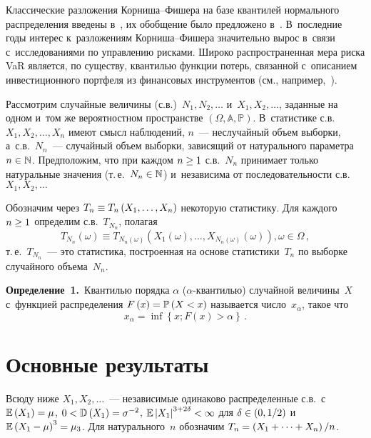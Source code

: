 \begin{multicols}{2}
Классические разложения
Кор\-ни\-ша--Фи\-ше\-ра на базе квантилей нормального  распределения введены
в~\cite{CornFish}, их обобщение было предложено в~\cite{HillDavis}.
В~последние годы интерес к~разложениям Кор\-ни\-ша--Фи\-ше\-ра значительно
вырос в~связи с~исследованиями по управ\-ле\-нию рисками. Широко
распространенная мера риска VaR является, по
существу, квантилью функции потерь, связанной с~описанием
инвестиционного портфеля из  финансовых инструментов (см., например,~\cite{Jashke}).


Рассмотрим случайные величины (с.в.)\ $N_{1}, N_{2}, \ldots$ и~$X_1, X_2, \ldots$, 
заданные на одном и~том же вероятностном пространстве 
$\left(\Omega,\mathbb{A},\mathbb{P}\right)$. В~статистике 
с.в.~$X_1, X_2, \ldots, X_n$ имеют смысл наблюдений, $n$~--- 
неслучайный объем выборки, а~с.в.~$N_n$~--- случайный объем выборки, зависящий 
от натурального параметра $n \hm\in \mathbb{N}$. Предположим, что при каждом 
$n \hm\ge 1$ с.в.~$N_n$ принимает только натуральные значения (т.\,е.\
$N_n \hm\in \mathbb{N}$) и~независима от последовательности с.в. $X_1, X_2, \ldots$

Обозначим через $T_n \hm\equiv T_n \left(X_1, \ldots, X_n\right)$ некоторую статистику.
 Для каждого $n \hm\ge 1$ определим с.в.~$T_{N_n}$, полагая
$$
T_{N_n} (\omega) \equiv T_{N_n(\omega)} \left(X_1 (\omega), \ldots, X_{N_n (\omega)} 
(\omega)\right),\omega \in \Omega\,,
$$
т.\,е.\ $T_{N_n}$~--- это статистика, построенная на основе статистики~$T_n$ 
по выборке случайного объема~$N_n$.

\smallskip

\noindent
\textbf{Определение~1.}\
Квантилью порядка $\alpha$ ($\alpha$-кван\-тилью) случайной величины~$X$ 
с~функцией распределения $F\left(x\right)\hm=\mathbb{P}\left(X<x\right)$ 
называется число~$x_{\alpha}$, такое что
$$ 
x_{\alpha} = \inf \left\{ x; F(x)>\alpha \right\}\,.
 $$

\section{Основные результаты}

Всюду ниже $X_1, X_2, \ldots $~--- независимые одинаково распределенные 
с.в.\ с~$\mathbb{E}\left(X_1\right)\hm=\mu$, 
$ 0\hm<\mathbb{D}\left(X_1\right)\hm=\sigma^{-2}$, 
$\mathbb{E}\left|X_1\right|^{3+2\delta}\hm < \infty$ для $\delta\hm \in 
\left(0,1/2\right)$ и~$\mathbb{E}\left(X_1\hm-\mu\right)^{3}\hm=\mu_3$. 
Для натурального~$n$ обозначим $T_n\hm=\left(X_1+\cdots+X_n\right)/n$.


\end{multicols}
